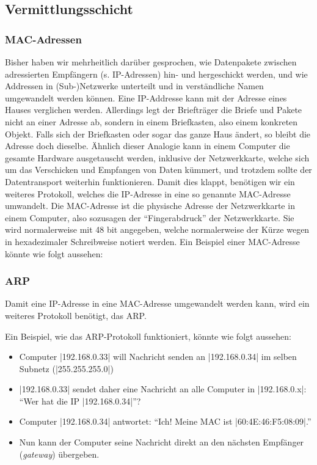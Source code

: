 \subsection{Vermittlungsschicht}
\subsubsection{MAC-Adressen}
Bisher haben wir mehrheitlich darüber gesprochen, wie Datenpakete zwischen adressierten Empfängern (s. \gls{IP}-Adressen) hin- und hergeschickt werden, und wie Addressen in (Sub-)Netzwerke unterteilt und in verständliche Namen umgewandelt werden können. Eine \gls{IP}-Addresse kann mit der Adresse eines Hauses verglichen werden. Allerdings legt der Briefträger die Briefe und Pakete nicht an einer Adresse ab, sondern in einem Briefkasten, also einem konkreten Objekt. Falls sich der Briefkasten oder sogar das ganze Haus ändert, so bleibt die Adresse doch dieselbe. Ähnlich dieser Analogie kann in einem Computer die gesamte Hardware ausgetauscht werden, inklusive der Netzwerkkarte, welche sich um das Verschicken und Empfangen von Daten kümmert, und trotzdem sollte der Datentransport weiterhin funktionieren. Damit dies klappt, benötigen wir ein weiteres Protokoll, welches die \gls{IP}-Adresse in eine so genannte \gls{MAC}-Adresse umwandelt. Die \gls{MAC}-Adresse ist die physische Adresse der Netzwerkkarte in einem Computer, also sozusagen der ``Fingerabdruck'' der Netzwerkkarte. Sie wird normalerweise mit 48 bit angegeben, welche normalerweise der Kürze wegen in hexadezimaler Schreibweise notiert werden. Ein Beispiel einer \gls{MAC}-Adresse könnte wie folgt aussehen: 

\subsubsection{ARP}
Damit eine \gls{IP}-Adresse in eine \gls{MAC}-Adresse umgewandelt werden kann, wird ein weiteres Protokoll benötigt, das \gls{ARP}.

Ein Beispiel, wie das \gls{ARP}-Protokoll funktioniert, könnte wie folgt aussehen:
\begin{itemize}
	\item Computer \commandbox|192.168.0.33| will Nachricht senden an \commandbox|192.168.0.34| im selben Subnetz (\commandBluebox|255.255.255.0|)
	\item \commandbox|192.168.0.33| sendet daher eine Nachricht an alle Computer in \commandbox|192.168.0.x|: ``Wer hat die IP \commandbox|192.168.0.34|''?
	\item Computer \commandbox|192.168.0.34| antwortet: ``Ich! Meine MAC ist \commandbox|60:4E:46:F5:08:09|.''
	\item Nun kann der Computer seine Nachricht direkt an den nächsten Empfänger (\textit{gateway}) übergeben.
\end{itemize}

